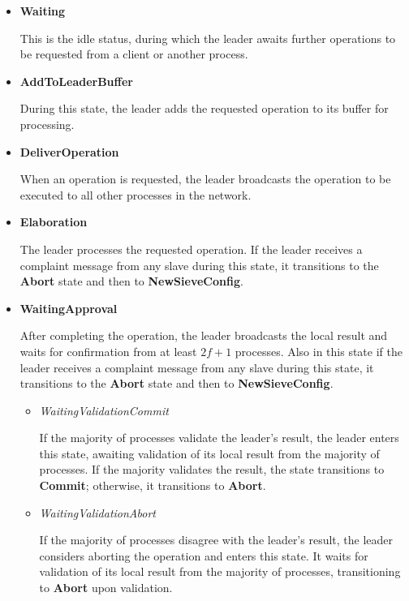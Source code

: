 \documentclass{scrartcl}
\begin{document}
\begin{itemize}
    \item \textbf{Waiting}
    
    This is the idle status, during which the leader awaits further operations to be requested from a client or another process.

    \item \textbf{AddToLeaderBuffer}
    
    During this state, the leader adds the requested operation to its buffer for processing.
    
    \item \textbf{DeliverOperation}
    
    When an operation is requested, the leader broadcasts the operation to be executed to all other processes in the network.
    
    \item \textbf{Elaboration}
    
    The leader processes the requested operation. If the leader receives a complaint message from any slave during this state, it transitions to the \textbf{Abort} state and then to \textbf{NewSieveConfig}.
    
    \item \textbf{WaitingApproval}
    
    After completing the operation, the leader broadcasts the local result and waits for confirmation from at least \(2f+1\) processes. Also in this state if the leader receives a complaint message from any slave during this state, it transitions to the \textbf{Abort} state and then to \textbf{NewSieveConfig}.
    
    \begin{itemize}
        \item \textit{WaitingValidationCommit}
        
        If the majority of processes validate the leader's result, the leader enters this state, awaiting validation of its local result from the majority of processes. If the majority validates the result, the state transitions to \textbf{Commit}; otherwise, it transitions to \textbf{Abort}.
        
        \item \textit{WaitingValidationAbort}
        
        If the majority of processes disagree with the leader's result, the leader considers aborting the operation and enters this state. It waits for validation of its local result from the majority of processes, transitioning to \textbf{Abort} upon validation.
    \end{itemize}
    

\end{itemize}
\end{document}
